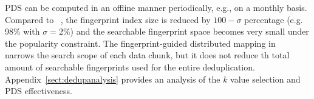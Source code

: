 PDS  can be computed in an offline manner periodically, e.g., on a monthly basis.
Compared to ~\cite{bottleneck08}, the fingerprint index  size is reduced by $100-\sigma$ percentage
(e.g. 98\% with $\sigma=2\%$)
and the searchable fingerprint space  becomes very small under the popularity constraint.  
The fingerprint-guided distributed mapping in ~\cite{extreme_binning09,Dong2011} narrows
the search scope of each data chunk, but it does not reduce th total amount of searchable fingerprints
used for the entire deduplication. 
Appendix~\ref{sect:dedupanalysis} provides an analysis of the $k$ value selection and
PDS effectiveness. 



